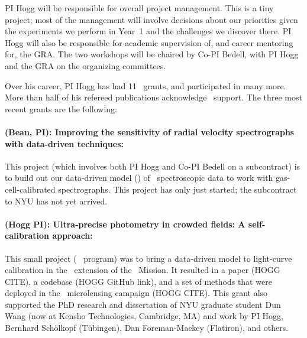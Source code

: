 \documentclass[12pt, letterpaper]{article}
\begin{document}
PI Hogg will be responsible for overall project management. This is a
tiny project; most of the management will involve decisions about our
priorities given the experiments we perform in Year~1 and the
challenges we discover there.
PI Hogg will also be responsible for academic supervision of, and
career mentoring for, the GRA.
The two workshops will be chaired by Co-PI Bedell, with PI Hogg and
the GRA on the organizing committees.


Over his career, PI Hogg has had 11 \NASA\ grants, and participated in
many more.
More than half of his refereed publications acknowledge \NASA\ support.
The three most recent grants are the following:

\paragraph{ (Bean, PI):
Improving the sensitivity of radial velocity spectrographs with data-driven techniques:}
This project (which involves both PI Hogg and Co-PI Bedell on a subcontract)
is to
build out our data-driven model (\wobble) of \EPRV\ spectroscopic data
to work with gas-cell-calibrated spectrographs. This project has only
just started; the subcontract to NYU has not yet arrived.

\paragraph{ (Hogg PI):
Ultra-precise photometry in crowded fields: A self-calibration approach:}
This small project (\Ktwo\  program)
was to bring a data-driven model to light-curve calibration
in the \Ktwo\ extension of the \Kepler\ Mission.
It resulted in a paper (HOGG CITE), a codebase (HOGG GitHub link),
and a set of methods that were deployed in the \Ktwo\ microlensing campaign (HOGG CITE).
This grant also supported the PhD research and dissertation of NYU graduate
student Dun Wang (now at Kensho Technologies, Cambridge, MA) and work
by PI Hogg, Bernhard Sch\"olkopf (T\"ubingen), Dan Foreman-Mackey
(Flatiron), and others.
\end{document}
